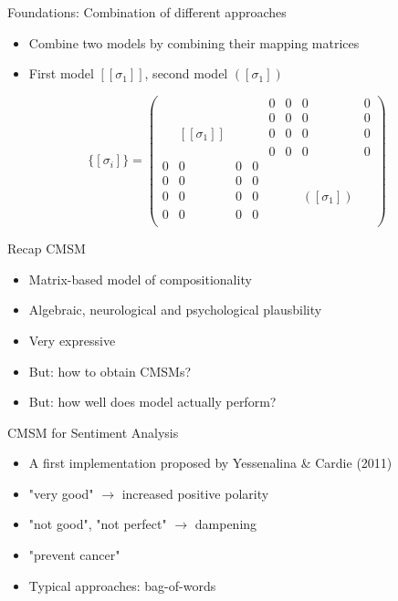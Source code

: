 \documentclass[12pt,a4paper]{beamer}
\begin{document}
\begin{frame}{Foundations: Combination of different approaches}
\begin{itemize}
\item Combine two models by combining their mapping matrices
\item First model $[[\sigma_{1}]]$, second model $([\sigma_{1}])$
\end{itemize}

$$  \{[\sigma_{i}]\} =
\left( \begin{array}{cccc|cccc}
 &  &  &  & 0 & 0 & 0 & 0   \\
 &  &  &  & 0 & 0 & 0 & 0   \\
 & [[\sigma_{1}]]  &  &  & 0 & 0 & 0 & 0   \\
 &  &  &  & 0 & 0 & 0 & 0   \\ \hline
0 & 0 & 0 & 0 &  &  &  &    \\
0 & 0 & 0 & 0 &  &  &  &    \\
0 & 0 & 0 & 0 &  &  & ([\sigma_{1}])  &    \\
0 & 0 & 0 & 0 &  &  &  &    \\
\end{array} \right) $$


\end{frame}


\begin{frame}{Recap CMSM}
\begin{itemize}
\item Matrix-based model of compositionality
\item Algebraic, neurological and psychological plausbility
\item Very expressive
\item But: how to obtain CMSMs?
\item But: how well does model actually perform?
\end{itemize}

\end{frame}


\begin{frame}{CMSM for Sentiment Analysis}
\begin{itemize}
\item A first implementation proposed by Yessenalina \&  Cardie (2011)
\item "very good" $\to$ increased positive polarity
\item "not good", "not perfect" $\to$ dampening
\item "prevent cancer"
\item Typical approaches: bag-of-words
\end{itemize}
\end{frame}
\end{document}
